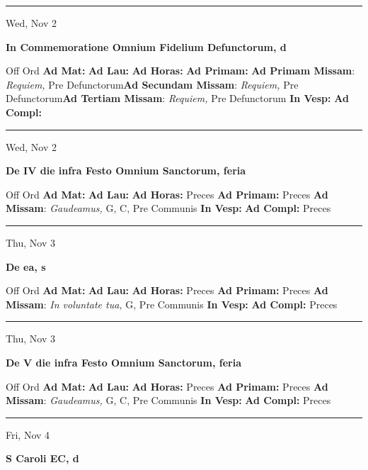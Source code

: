 \documentclass[letterpaper, 10pt]{article}
\begin{document}
\hrule
\begin{center}
Wed, Nov 2
\end{center}\textbf{ \large In Commemoratione Omnium Fidelium Defunctorum, \textnormal{\normalsize d}}
\begin{justify}
Off Ord
\textbf{Ad Mat: }
\textbf{Ad Lau: }
\textbf{Ad Horas: }
\textbf{Ad Primam: }
\textbf{Ad Primam Missam}: \textit{Requiem,} Pre Defunctorum\textbf{Ad Secundam Missam}: \textit{Requiem,} Pre Defunctorum\textbf{Ad Tertiam Missam}: \textit{Requiem,} Pre Defunctorum
\textbf{In Vesp: }
\textbf{Ad Compl: }\end{justify}



\hrule
\begin{center}
Wed, Nov 2
\end{center}\textbf{ \large De IV die infra Festo Omnium Sanctorum, \textnormal{\normalsize feria}}
\begin{justify}
Off Ord
\textbf{Ad Mat: }
\textbf{Ad Lau: }
\textbf{Ad Horas: }Preces
\textbf{Ad Primam: }Preces
\textbf{Ad Missam}: \textit{Gaudeamus,} G, C, Pre Communis
\textbf{In Vesp: }
\textbf{Ad Compl: }Preces\end{justify}



\hrule
\begin{center}
Thu, Nov 3
\end{center}\textbf{ \large De ea, \textnormal{\normalsize s}}
\begin{justify}
Off Ord
\textbf{Ad Mat: }
\textbf{Ad Lau: }
\textbf{Ad Horas: }Preces
\textbf{Ad Primam: }Preces
\textbf{Ad Missam}: \textit{In voluntate tua,} G, Pre Communis
\textbf{In Vesp: }
\textbf{Ad Compl: }Preces\end{justify}



\hrule
\begin{center}
Thu, Nov 3
\end{center}\textbf{ \large De V die infra Festo Omnium Sanctorum, \textnormal{\normalsize feria}}
\begin{justify}
Off Ord
\textbf{Ad Mat: }
\textbf{Ad Lau: }
\textbf{Ad Horas: }Preces
\textbf{Ad Primam: }Preces
\textbf{Ad Missam}: \textit{Gaudeamus,} G, C, Pre Communis
\textbf{In Vesp: }
\textbf{Ad Compl: }Preces\end{justify}



\hrule
\begin{center}
Fri, Nov 4
\end{center}\textbf{ \large S Caroli EC, \textnormal{\normalsize d}}
\end{document}
